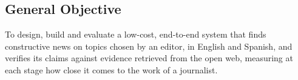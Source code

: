 
\subsection{General Objective}

To design, build and evaluate a low-cost, end-to-end system that finds
constructive news on topics chosen by an editor, in English and
Spanish, and verifies its claims against evidence retrieved from the
open web, measuring at each stage how close it comes to the work of a
journalist.
